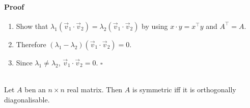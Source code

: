 \documentclass{article}
\begin{document}
\paragraph*{Proof}
\begin{enumerate}
    \item Show that $\lambda_1(\vec v_1 \cdot \vec v_2)=\lambda_2(\vec v_1\cdot\vec v_2)$ by using $x\cdot y =x^\intercal y$ and $A^\intercal =A$.
    \item Therefore $(\lambda_1-\lambda_2)(\vec v_1 \cdot \vec v_2)=0$.
    \item Since $\lambda_1\not=\lambda_2$, $\vec v_1 \cdot \vec v_2=0$. $\square$
\end{enumerate}
\begin{theorem}
    \\
    Let $A$ ben an $n\times n$ real matrix. Then $A$ is symmetric iff it is orthogonally diagonalisable.
\end{theorem}
\end{document}
